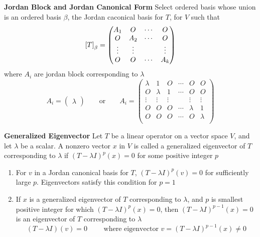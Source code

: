 \documentclass[11pt]{article}
\begin{document}
\begin{defn*}
    \textbf{Jordan Block and Jordan Canonical Form} Select ordered basis whose union is an ordered basis $\beta$, the Jordan caconical basis for $T$, for $V$ such that 
    \[
        \left[ T \right]_{\beta} = 
        \begin{pmatrix}
            A_1 & O & \cdots & O \\
            O & A_2 & \cdots & O \\
            \vdots & \vdots & & \vdots \\
            O & O & \cdots & A_k \\ 
        \end{pmatrix}    
    \]
    where $A_i$ are jordan block corresponding to $\lambda$
    \[
        A_i = 
        \begin{pmatrix}
            \lambda
        \end{pmatrix}
        \qquad 
        \text{or}
        \qquad 
        A_i = 
        \begin{pmatrix}
            \lambda & 1 & O & \cdots & O & O \\
            O & \lambda & 1 & \cdots & O & O \\
            \vdots & \vdots & \vdots & & \vdots & \vdots \\
            O & O & O & \cdots & \lambda & 1 \\ 
            O & O & O & \cdots & O & \lambda \\ 
        \end{pmatrix}
    \]
\end{defn*}


\begin{defn*}
    \textbf{Generalized Eigenvector} Let $T$ be a linear operator on a vector space $V$, and let $\lambda$ be a scalar. A nonzero vector $x$ in $V$ is called a generalized eigenvector of $T$ corresponding to $\lambda$ if $(T-\lambda I)^p(x) = 0$ for some positive integer $p$
    \begin{enumerate}
        \item For $v$ in a Jordan canonical basis for $T$, $(T-\lambda I)^p (v) = 0$ for sufficiently large $p$. Eigenvectors satisfy this condition for $p=1$
        \item If $x$ is a generalized eigenvector of $T$ corresponding to $\lambda$, and $p$ is smallest positive integer for which $(T-\lambda I)^p(x)=0$, then $(T-\lambda I)^{p-1}(x)=0$ is an eigenvector of $T$ corresponding to $\lambda$
        \[
            (T-\lambda I)(v) = 0
            \qquad 
            \text{ where eigenvector }
            v = (T-\lambda I)^{p-1}(x) \neq 0
        \]
    \end{enumerate}
\end{defn*}
\end{document}
